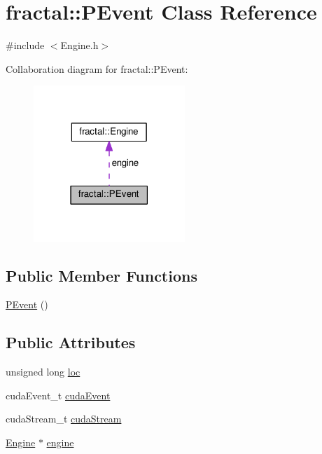 \hypertarget{classfractal_1_1PEvent}{\section{fractal\+:\+:P\+Event Class Reference}
\label{classfractal_1_1PEvent}
}


{\ttfamily \#include $<$Engine.\+h$>$}



Collaboration diagram for fractal\+:\+:P\+Event\+:\nopagebreak
\begin{figure}[H]
\begin{center}
\leavevmode
\includegraphics[width=162pt]{d4/da1/classfractal_1_1PEvent__coll__graph}
\end{center}
\end{figure}
\subsection*{Public Member Functions}
\begin{DoxyCompactItemize}
\item 
\hyperlink{classfractal_1_1PEvent_a8b312996c1ea893e9b4fa527755ed0b4}{P\+Event} ()
\end{DoxyCompactItemize}
\subsection*{Public Attributes}
\begin{DoxyCompactItemize}
\item 
unsigned long \hyperlink{classfractal_1_1PEvent_ae2c92e05304c05636ebe15728d13788f}{loc}
\item 
cuda\+Event\+\_\+t \hyperlink{classfractal_1_1PEvent_ada08050f5728d816091de2a7b3fb5163}{cuda\+Event}
\item 
cuda\+Stream\+\_\+t \hyperlink{classfractal_1_1PEvent_a6cda2428b24079deeff47349649f83d7}{cuda\+Stream}
\item 
\hyperlink{classfractal_1_1Engine}{Engine} $\ast$ \hyperlink{classfractal_1_1PEvent_a9e6bab27d00cf626cf5c0047a2b2977d}{engine}
\end{DoxyCompactItemize}


